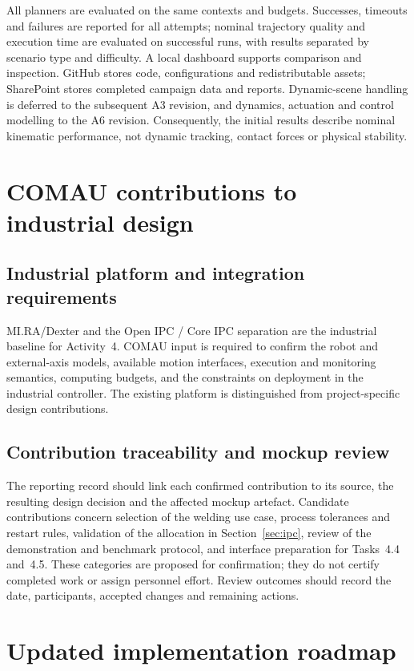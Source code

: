 \documentclass{plan4ari_report}
\begin{document}
All planners are evaluated on the same contexts and budgets. Successes, timeouts and failures are reported for all attempts; nominal trajectory quality and execution time are evaluated on successful runs, with results separated by scenario type and difficulty. A local dashboard supports comparison and inspection. GitHub stores code, configurations and redistributable assets; SharePoint stores completed campaign data and reports. Dynamic-scene handling is deferred to the subsequent A3 revision, and dynamics, actuation and control modelling to the A6 revision. Consequently, the initial results describe nominal kinematic performance, not dynamic tracking, contact forces or physical stability.

\section{COMAU contributions to industrial design}\label{sec:comau}
\subsection{Industrial platform and integration requirements}
MI.RA/Dexter and the Open IPC / Core IPC separation are the industrial baseline for Activity~4. COMAU input is required to confirm the robot and external-axis models, available motion interfaces, execution and monitoring semantics, computing budgets, and the constraints on deployment in the industrial controller. The existing platform is distinguished from project-specific design contributions.

\subsection{Contribution traceability and mockup review}
The reporting record should link each confirmed contribution to its source, the resulting design decision and the affected mockup artefact. Candidate contributions concern selection of the welding use case, process tolerances and restart rules, validation of the allocation in Section~\ref{sec:ipc}, review of the demonstration and benchmark protocol, and interface preparation for Tasks~4.4 and~4.5. These categories are proposed for confirmation; they do not certify completed work or assign personnel effort. Review outcomes should record the date, participants, accepted changes and remaining actions.
\section{Updated implementation roadmap}\label{sec:roadmap}
\end{document}
